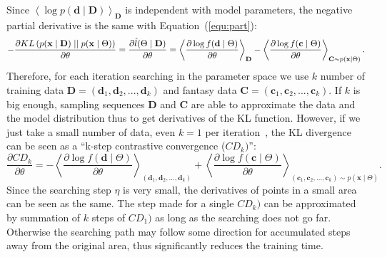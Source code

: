 \documentclass[11pt,twoside,a4paper]{article}
\begin{document}
	Since $\left \langle \log p(\mathbf{d} \mid \mathbf{D}) \right \rangle_{\mathbf{D}}$ is independent with model parameters, the negative partial derivative is the same with Equation~(\ref{equ:part}):
	\begin{equation}
	\label{equ:kl}
		-\dfrac{\partial KL \left( p(\mathbf{x} \mid \mathbf{D}) \mid \mid p(\mathbf{x} \mid \Theta) \right)}{\partial \theta}
		= \dfrac{\partial \hat{l} (\Theta \mid \mathbf{D})}{\partial \theta} \\
		= \left \langle \dfrac{\partial \log f(\mathbf{d} \mid \Theta)}{\partial \theta}\right \rangle_{\mathbf{D}} - \left \langle \dfrac{\partial \log f(\mathbf{c} \mid \Theta)}{\partial \theta}\right \rangle_{\mathbf{C} \sim p(\mathbf{x} \mid \Theta)} .
	\end{equation}
	Therefore, for each iteration searching in the parameter space we use $ k $ number of training data $ \mathbf{D}=(\mathbf{d}_1, \mathbf{d}_2, ..., \mathbf{d}_k) $ and fantasy data $ \mathbf{C}=(\mathbf{c}_1, \mathbf{c}_2, ..., \mathbf{c}_k) $.
	If $ k $ is big enough, sampling sequences $ \mathbf{D} $ and $ \mathbf{C} $ are able to approximate the data and the model distribution thus to get derivatives of the KL function.
	However, if we just take a small number of data, even $ k = 1 $ per iteration~\cite{hinton2002training}, the KL divergence can be seen as a ``k-step contrastive convergence ($ CD_{k}) $'':
	\begin{equation}
		\dfrac{\partial CD_{k}}{\partial \theta} 
		= - \left \langle \dfrac{\partial \log f(\mathbf{d} \mid \Theta)}{\partial \theta}\right \rangle_{(\mathbf{d}_1, \mathbf{d}_2, ..., \mathbf{d}_k) } + \left \langle \dfrac{\partial \log f(\mathbf{c} \mid \Theta)}{\partial \theta}\right \rangle_{(\mathbf{c}_1, \mathbf{c}_2, ..., \mathbf{c}_k) \sim p(\mathbf{x} \mid \Theta)}.
	\end{equation}
	Since the searching step $ \eta $ is very small, the derivatives of points in a small area can be seen as the same.
	The step made for a single $ CD_{k}) $ can be approximated by summation of $ k $ steps of $ CD_{1}) $ as long as the searching does not go far.
	Otherwise the searching path may follow some direction for accumulated steps away from the original area, thus significantly reduces the training time.
\end{document}
